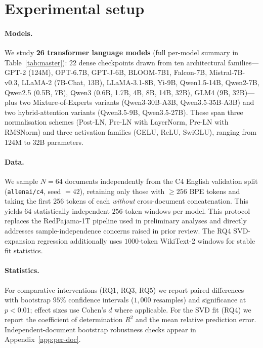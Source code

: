 
\section{Experimental setup}
\label{app:setup}

\paragraph{Models.}
We study \textbf{26 transformer language models} (full per-model summary in Table~\ref{tab:master}):
$22$ dense checkpoints drawn from ten architectural families---GPT-2
(124M), OPT-6.7B, GPT-J-6B, BLOOM-7B1, Falcon-7B, Mistral-7B-v0.3,
LLaMA-2 (7B-Chat, 13B), LLaMA-3.1-8B, Yi-9B, Qwen1.5-14B, Qwen2-7B,
Qwen2.5 (0.5B, 7B), Qwen3 (0.6B, 1.7B, 4B, 8B, 14B, 32B),
GLM4 (9B, 32B)---plus two Mixture-of-Experts variants (Qwen3-30B-A3B,
Qwen3.5-35B-A3B) and two hybrid-attention variants (Qwen3.5-9B, Qwen3.5-27B).
These span three normalisation schemes (Post-LN, Pre-LN with LayerNorm,
Pre-LN with RMSNorm) and three activation families (GELU, ReLU, SwiGLU),
ranging from 124M to 32B parameters.

\paragraph{Data.}
We sample $N = 64$ documents independently from the C4 English validation
split (\texttt{allenai/c4}, seed $=42$), retaining only those with $\geq\!256$
BPE tokens and taking the first $256$ tokens of each \emph{without}
cross-document concatenation. This yields $64$ statistically independent
$256$-token windows per model. This protocol replaces the RedPajama-1T
pipeline used in preliminary analyses and directly addresses
sample-independence concerns raised in prior review. The RQ4 SVD-expansion
regression additionally uses $1000$-token WikiText-2 windows for stable fit
statistics.

\paragraph{Statistics.}
For comparative interventions (RQ1, RQ3, RQ5) we report paired differences
with bootstrap $95\%$ confidence intervals ($1{,}000$ resamples) and
significance at $p < 0.01$; effect sizes use Cohen's $d$ where applicable.
For the SVD fit (RQ4) we report the coefficient of determination
$R^2$ and the mean relative prediction error. Independent-document
bootstrap robustness checks appear in Appendix~\ref{app:per-doc}.

